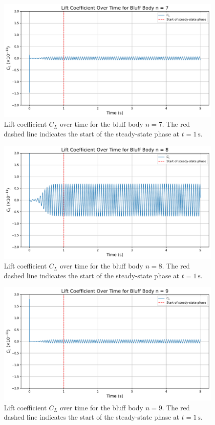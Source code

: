 \begin{figure}[H]
	\centering
	\includegraphics[width=\textwidth]{images/7face_graph}
	\caption{Lift coefficient $C_L$ over time for the bluff body $n=7$. The red dashed line indicates the start of the steady-state phase at $t = 1\,\mathrm{s}$.}
	\label{fig:7FaceGraph} 
\end{figure}

\begin{figure}[H]
	\centering
	\includegraphics[width=\textwidth]{images/8face_graph}
	\caption{Lift coefficient $C_L$ over time for the bluff body $n=8$. The red dashed line indicates the start of the steady-state phase at $t = 1\,\mathrm{s}$.}
	\label{fig:8FaceGraph} 
\end{figure}

\begin{figure}[H]
	\centering
	\includegraphics[width=\textwidth]{images/9face_graph}
	\caption{Lift coefficient $C_L$ over time for the bluff body $n=9$. The red dashed line indicates the start of the steady-state phase at $t = 1\,\mathrm{s}$.}
	\label{fig:9FaceGraph} 
\end{figure}

